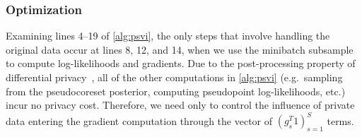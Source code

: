 \subsubsection{Optimization}
\label{sec:private-wu-opt}
Examining lines 4--19 of \cref{alg:psvi}, the only steps that involve
handling the original data occur at lines 8, 12, and 14, 
when we use the minibatch subsample to compute log-likelihoods and gradients. 
Due to the post-processing property of differential privacy~\citep{dwork14},
all of the other computations in \cref{alg:psvi} (e.g.~sampling from the pseudocoreset posterior, 
computing pseudopoint log-likelihoods, etc.) incur no privacy cost.
Therefore, we need only %
to control the influence of private data entering  the gradient computation through the vector of $ (g_s^T1)_{s=1}^{S}$ terms.

